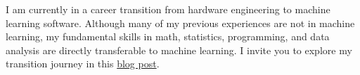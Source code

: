

\begin{cvparagraph}

I am currently in a career transition from hardware engineering to machine learning software. Although many of my previous experiences are not in machine learning, my fundamental skills in math, statistics, programming, and data analysis are directly transferable to machine learning. I invite you to explore my transition journey in this \href{https://medium.com/@mpchang17/making-the-leap-from-hardware-to-machine-learning-d85853b59a05}{blog post}.
\end{cvparagraph}
